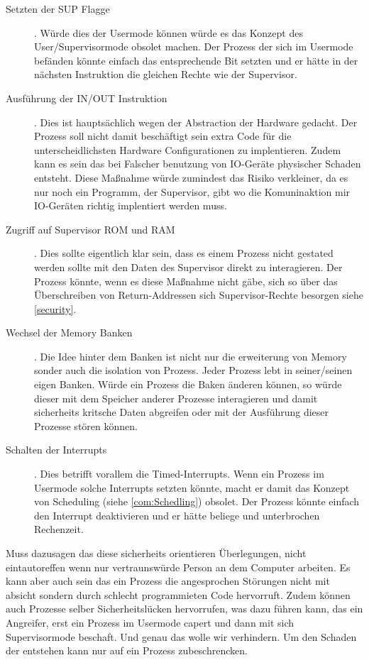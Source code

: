 \documentclass{scrartcl}
\begin{document}
\begin{description}
	\item[Setzten der SUP Flagge]. Würde dies der Usermode können würde es das Konzept des User/Supervisormode obsolet machen. Der Prozess der sich im Usermode befänden könnte einfach das entsprechende Bit setzten und er hätte in der nächsten Instruktion die gleichen Rechte wie der Supervisor.
	
	\item[Ausführung der IN/OUT Instruktion]. Dies ist hauptsächlich wegen der Abstraction der Hardware gedacht. Der Prozess soll nicht damit beschäftigt sein extra Code für die unterscheidlichsten Hardware Configurationen zu implentieren. Zudem kann es sein das bei Falscher benutzung von IO-Geräte physischer Schaden entsteht. Diese Maßnahme würde zumindest das Risiko verkleiner, da es nur noch ein Programm, der Supervisor, gibt wo die Komuninaktion mir IO-Geräten richtig implentiert werden muss.
	
	\item[Zugriff auf Supervisor ROM und RAM]. Dies sollte eigentlich klar sein, dass es einem Prozess nicht gestated werden sollte mit den Daten des Supervisor direkt zu interagieren. Der Prozess könnte, wenn es diese Maßnahme nicht gäbe, sich so über das Überschreiben von Return-Addressen sich Supervisor-Rechte besorgen siehe \autoref{security}. 

	\item[Wechsel der Memory Banken]. Die Idee hinter dem Banken ist nicht nur die erweiterung von Memory sonder auch die isolation von Prozess. Jeder Prozess lebt in seiner/seinen eigen Banken. Würde ein Prozess die Baken änderen können, so würde dieser mit dem Speicher anderer Prozesse interagieren und damit sicherheits kritsche Daten abgreifen oder mit der Ausführung dieser Prozesse stören können.

	\item [Schalten der Interrupts]. Dies betrifft vorallem die Timed-Interrupts. Wenn ein Prozess im Usermode solche Interrupts setzten könnte, macht er damit das Konzept von Scheduling (siehe \autoref{com:Schedling}) obsolet. Der Prozess könnte einfach den Interrupt deaktivieren und er hätte beliege und unterbrochen Rechenzeit. 
\end{description}

Muss dazusagen das diese sicherheits orientieren Überlegungen, nicht eintautoreffen wenn nur vertraunswürde Person an dem Computer arbeiten. Es kann aber auch sein das ein Prozess die angesprochen Störungen nicht mit absicht sondern durch schlecht programmieten Code hervorruft. Zudem können auch Prozesse selber Sicherheitslücken hervorrufen, was dazu führen kann, das ein Angreifer, erst ein Prozess im Usermode capert und dann mit sich Supervisormode beschaft. Und genau das wolle wir verhindern. Um den Schaden der entstehen kann nur auf ein Prozess zubeschrencken.
\end{document}
